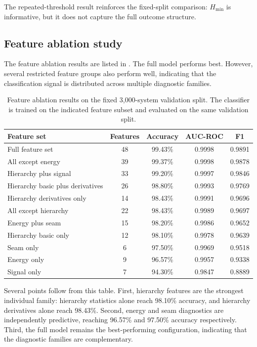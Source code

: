 \documentclass[12pt,a4paper]{article}
\newcommand{\Hmin}{H_{\min}}
\begin{document}
The repeated-threshold result reinforces the fixed-split comparison: \(\Hmin\) is informative, but it does not capture the full outcome structure.

\subsection{Feature ablation study}
\label{sec:ablation_results}

The feature ablation results are listed in . The full model performs best. However, several restricted feature groups also perform well, indicating that the classification signal is distributed across multiple diagnostic families.

\begin{table}[H]
\centering
\caption{Feature ablation results on the fixed 3,000-system validation split. The classifier is trained on the indicated feature subset and evaluated on the same validation split.}
\label{tab:ablation_results}
\begin{tabular}{lcccc}
\toprule
Feature set & Features & Accuracy & AUC-ROC & F1 \\
\midrule
Full feature set & 48 & 99.43\% & 0.9998 & 0.9891 \\
All except energy & 39 & 99.37\% & 0.9998 & 0.9878 \\
Hierarchy plus signal & 33 & 99.20\% & 0.9997 & 0.9846 \\
Hierarchy basic plus derivatives & 26 & 98.80\% & 0.9993 & 0.9769 \\
Hierarchy derivatives only & 14 & 98.43\% & 0.9991 & 0.9696 \\
All except hierarchy & 22 & 98.43\% & 0.9989 & 0.9697 \\
Energy plus seam & 15 & 98.20\% & 0.9986 & 0.9652 \\
Hierarchy basic only & 12 & 98.10\% & 0.9978 & 0.9639 \\
Seam only & 6 & 97.50\% & 0.9969 & 0.9518 \\
Energy only & 9 & 96.57\% & 0.9957 & 0.9338 \\
Signal only & 7 & 94.30\% & 0.9847 & 0.8889 \\
\bottomrule
\end{tabular}
\end{table}

Several points follow from this table. First, hierarchy features are the strongest individual family: hierarchy statistics alone reach 98.10\% accuracy, and hierarchy derivatives alone reach 98.43\%. Second, energy and seam diagnostics are independently predictive, reaching 96.57\% and 97.50\% accuracy respectively. Third, the full model remains the best-performing configuration, indicating that the diagnostic families are complementary.
\end{document}
